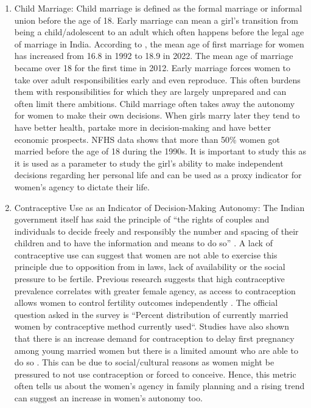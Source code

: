 \begin{enumerate}
    \item Child Marriage: Child marriage is defined as the formal marriage or informal union before the age of 18. Early marriage can mean a girl's transition from being a child/adolescent to an adult which often happens before the legal age of marriage in India. According to \cite{globaldata2012}, the mean age of first marriage for women has increased from 16.8 in 1992 to 18.9 in 2022. The mean age of marriage became over 18 for the first time in 2012. Early marriage forces women to take over adult responsibilities early and even reproduce. This often burdens them with responsibilities for which they are largely unprepared and can often limit there ambitions. Child marriage often takes away the autonomy for women to make their own decisions. When girls marry later they tend to have better health, partake more in decision-making and have better economic prospects. NFHS data shows that more than 50\% women got married before the age of 18 during the 1990s. It is important to study this as it is used as a parameter to study the girl's ability to make independent decisions regarding her personal life and can be used as a proxy indicator for women's agency to dictate their life.
    \item  Contraceptive Use as an Indicator of Decision-Making Autonomy: The Indian government itself has said the principle of “the rights of couples and individuals to decide freely and responsibly the number and spacing of their children and to have the information and means to do so”  \citep{pachauri2014priority}. A lack of contraceptive use can suggest that women are not able to exercise this principle due to opposition from in laws, lack of availability or the social pressure to be fertile. Previous research suggests that high contraceptive prevalence correlates with greater female agency, as access to contraception allows women to control fertility outcomes independently \citep{kishor2004women}. The official question asked in the survey is ``Percent distribution of currently married women by contraceptive method currently used``. Studies have also shown that there is an increase demand for contraception to delay first pregnancy among young married women but there is a limited amount who are able to do so \citep{jejeebhoy2014demand}. This can be due to social/cultural reasons as women might be pressured to not use contraception or forced to conceive. Hence, this metric often tells us about the women's agency in family planning and a rising trend can suggest an increase in women's autonomy too.


\end{enumerate}
